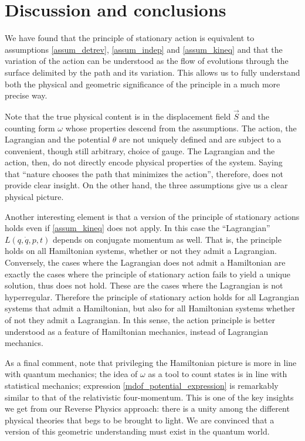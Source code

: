 \documentclass[fleqn,10pt]{wlscirep}
\begin{document}
\section*{Discussion and conclusions}

We have found that the principle of stationary action is equivalent to assumptions \ref{assum_detrev}, \ref{assum_indep} and \ref{assum_kineq} and that the variation of the action can be understood as the flow of evolutions through the surface delimited by the path and its variation. This allows us to fully understand both the physical and geometric significance of the principle in a much more precise way.

Note that the true physical content is in the displacement field $\vec{S}$ and the counting form $\omega$ whose properties descend from the assumptions. The action, the Lagrangian and the potential $\theta$ are not uniquely defined and are subject to a convenient, though still arbitrary, choice of gauge. The Lagrangian and the action, then, do not directly encode physical properties of the system. Saying that ``nature chooses the path that minimizes the action'', therefore, does not provide clear insight. On the other hand, the three assumptions give us a clear physical picture.

Another interesting element is that a version of the principle of stationary actions holds even if \ref{assum_kineq} does not apply. In this case the ``Lagrangian'' $L(q,\dot{q},p,t)$ depends on conjugate momentum as well. That is, the principle holds on all Hamiltonian systems, whether or not they admit a Lagrangian. Conversely, the cases where the Lagrangian does not admit a Hamiltonian are exactly the cases where the principle of stationary action fails to yield a unique solution, thus does not hold. These are the cases where the Lagrangian is not hyperregular. Therefore the principle of stationary action holds for all Lagrangian systems that admit a Hamiltonian, but also for all Hamiltonian systems whether of not they admit a Lagrangian. In this sense, the action principle is better understood as a feature of Hamiltonian mechanics, instead of Lagrangian mechanics\cite{souriau1970structure, arnold1989mathematical}.

As a final comment, note that privileging the Hamiltonian picture is more in line with quantum mechanics; the idea of $\omega$ as a tool to count states is in line with statistical mechanics; expression \ref{mdof_potential_expression} is remarkably similar to that of the relativistic four-momentum. This is one of the key insights we get from our Reverse Physics approach: there is a unity among the different physical theories that begs to be brought to light. We are convinced that a version of this geometric understanding must exist in the quantum world.
\end{document}
